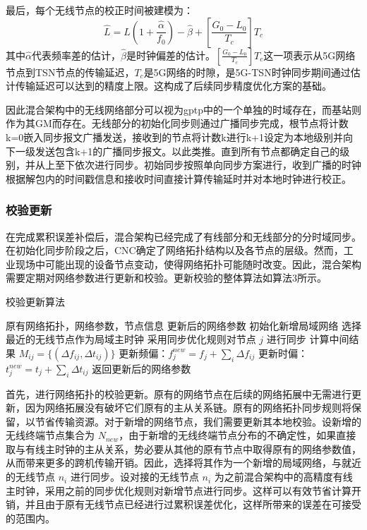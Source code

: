 \documentclass[UTF8,a4paper,12pt]{ctexart}
\numberwithin{equation}{section}
\begin{document}
最后，每个无线节点的校正时间被建模为：
\begin{equation}
	\widehat{L}=L\left(1+\frac{\widehat{\alpha}}{f_0}\right)-\widehat{\beta}+\left[\frac{G_0-L_0}{T_c}\right] T_c
\end{equation}
其中$\widehat{α}$代表频率差的估计，$\widehat{β}$是时钟偏差的估计。$[\frac{G_0-L_0}{T_c}]T_c$这一项表示从5G网络节点到TSN节点的传输延迟，$T_c$是5G网络的时隙，是5G-TSN时钟同步期间通过估计传输延迟可以达到的精度上限。这构成了后续同步精度优化方案的基础。

因此混合架构中的无线网络部分可以视为gptp中的一个单独的时域存在，而基站则作为其GM而存在。无线部分的初始化同步则通过广播同步完成，根节点将计数k=0嵌入同步报文广播发送，接收到的节点将计数k进行k+1设定为本地级别并向下一级发送包含k+1的广播同步报文。以此类推。直到所有节点都确定自己的级别，并从上至下依次进行同步。初始同步按照单向同步方案进行，收到广播的时钟根据解包内的时间戳信息和接收时间直接计算传输延时并对本地时钟进行校正。

\subsubsection{校验更新}
在完成累积误差补偿后，混合架构已经完成了有线部分和无线部分的分时域同步。在初始化同步阶段之后，CNC确定了网络拓扑结构以及各节点的层级。然而，工业现场中可能出现的设备节点变动，使得网络拓扑可能随时改变。因此，混合架构需要定期对网络参数进行更新和校验。更新校验的整体算法如算法3所示。
\begin{algorithm}
	\caption{校验更新算法}
	\begin{algorithmic}[1]
		\REQUIRE
		原有网络拓扑，网络参数，节点信息
		\ENSURE
		更新后的网络参数
		\STATE 初始化新增局域网络
		\STATE 选择最近的无线节点作为局域主时钟
		\STATE 采用同步优化规则对节点 $j$ 进行同步
		\ENDFOR
		\STATE 计算中间结果 $M_{ij} = \{(\Delta f_{ij}, \Delta t_{ij})\}$
		\STATE 更新频偏：$f_j^{new} = f_j + \sum_{i} \Delta f_{ij}$
		\STATE 更新时偏：$t_j^{new} = t_j + \sum_{i} \Delta t_{ij}$
		\ENDFOR
		\STATE 返回更新后的网络参数
	\end{algorithmic}
\end{algorithm}
首先，进行网络拓扑的校验更新。原有的网络节点在后续的网络拓展中无需进行更新，因为网络拓展没有破坏它们原有的主从关系链。原有的网络拓扑同步规则将保留，以节省传输资源。对于新增的网络节点，我们需要更新其本地校验。设新增的无线终端节点集合为 $N_{new}$，由于新增的无线终端节点分布的不确定性，如果直接取与有线主时钟的主从关系，势必要从其他的原有节点中取得原有的网络参数值，从而带来更多的跨机传输开销。因此，选择将其作为一个新增的局域网络，与就近的无线节点 $n_i$ 进行同步。设对接的无线节点 $n_i$ 为之前混合架构中的高精度有线主时钟，采用之前的同步优化规则对新增节点进行同步。这样可以有效节省计算开销，并且由于原有无线节点已经进行过累积误差优化，这样所带来的误差在可接受的范围内。
\end{document}
